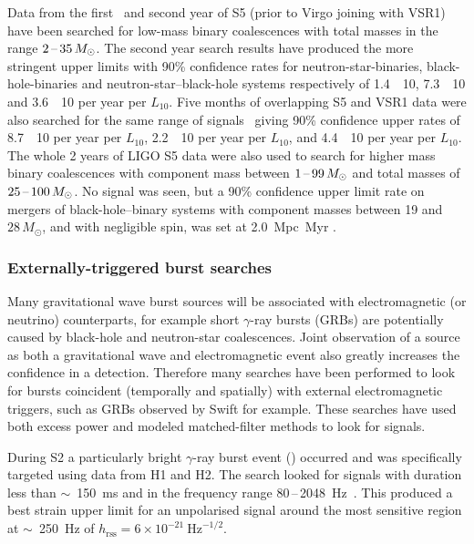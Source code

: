 \documentclass{article}
\begin{document}
Data from the first~\cite{Abbott:2009e} and second year of S5 (prior to Virgo
joining with VSR1)~\cite{Abbott:2009f} have been searched for low-mass binary
coalescences with total masses in the range $2\mbox{\,--\,}35\,M_{\odot}$. The second
year search results have produced the more stringent upper limits with 90\%
confidence rates for neutron-star-binaries, black-hole-binaries and neutron-star--black-hole systems respectively of 1.4~\texttimes~10,
7.3~\texttimes~10 and 3.6~\texttimes~10 per year
per $L_{10}$. Five months of overlapping S5 and VSR1 data were also
searched for the same range of signals~\cite{Abadie:2010f} giving 90\%
confidence upper rates of 8.7~\texttimes~10 per year per
$L_{10}$, 2.2~\texttimes~10 per year per $L_{10}$, and
4.4~\texttimes~10 per year per $L_{10}$. The whole 2 years
of LIGO S5 data were also used to search for higher mass binary
coalescences with component mass between $1\mbox{\,--\,}99\,M_{\odot}$
and total masses of $25\mbox{\,--\,}100\,M_{\odot}$. No signal was
seen, but a 90\% confidence upper limit rate on mergers of black-hole--binary systems with component masses between 19 and
$28\,M_{\odot}$, and with negligible spin, was set at
2.0~Mpc~Myr \cite{Abadie:2011a}.


\subsubsection{Externally-triggered burst searches}

Many gravitational wave burst sources will be associated with electromagnetic
(or neutrino) counterparts, for example short $\gamma$-ray bursts (GRBs) are
potentially caused by black-hole and neutron-star coalescences. Joint
observation of a source as both a gravitational wave and electromagnetic
event also greatly increases the confidence in a detection. Therefore many
searches have been performed to look for bursts coincident (temporally and
spatially) with external electromagnetic triggers, such as GRBs observed by
Swift for example. These searches have used both excess power and modeled
matched-filter methods to look for signals.

During S2 a particularly bright $\gamma$-ray burst event () occurred
and was specifically targeted using data from H1 and H2. The search looked for
signals with duration less than $\sim$~150~ms and in the frequency range
80\,--\,2048~Hz~\cite{Abbott:2005d}. This produced a best strain upper limit for an
unpolarised signal around the most sensitive region at  $\sim$~250~Hz
of $h_{\mathrm{rss}}=6\times10^{-21} \mathrm{\ Hz}^{-1/2}$.
\end{document}
